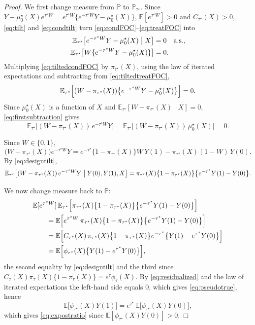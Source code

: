 \documentclass[11pt]{article}
\theoremstyle{definition}
\theoremstyle{plain}
\newcommand{\E}{\mathbb{E}}
\newcommand{\1}{\mathbf{1}}
\begin{document}
\begin{proof}
We first change measure from $\mathbb P$ to $\mathbb P_{\tau^\star}$.  Since $Y-\mu_0^\star(X)e^{\tau^\star W}=e^{\tau^\star W}\bigl\{e^{-\tau^\star W}Y-\mu_0^\star(X)\bigr\}$, $\E[e^{\tau^\star W}]>0$ and $C_{\tau^\star}(X)>0$, \eqref{eq:tilt} and \eqref{eq:condtilt} turn \eqref{eq:condFOC}--\eqref{eq:treatFOC} into
\begin{align}
\E_{\tau^\star}\big[e^{-\tau^\star W}Y-\mu_0^\star(X)\bigm| X\big] &= 0 \quad \text{a.s.},
\label{eq:tiltedcondFOC}
\\
\E_{\tau^\star}\big[W\{e^{-\tau^\star W}Y-\mu_0^\star(X)\}\big] &= 0.
\label{eq:tiltedtreatFOC}
\end{align}
Multiplying \eqref{eq:tiltedcondFOC} by $\pi_{\tau^\star}(X)$, using the law of iterated expectations and subtracting from \eqref{eq:tiltedtreatFOC},
\begin{equation}
\E_{\tau^\star}\Bigl[(W-\pi_{\tau^\star}(X))\bigl\{e^{-\tau^\star W}Y-\mu_0^\star(X)\bigr\}\Bigr]=0 .
\label{eq:firstsubtraction}
\end{equation}
Since $\mu_0^\star(X)$ is a function of $X$ and $\E_{\tau^\star}[W-\pi_{\tau^\star}(X)\mid X]=0$, \eqref{eq:firstsubtraction} gives
\begin{equation}
\E_{\tau^\star}\bigl[(W-\pi_{\tau^\star}(X))\,e^{-\tau^\star W}Y\bigr]
=
\E_{\tau^\star}\bigl[(W-\pi_{\tau^\star}(X))\,\mu_0^\star(X)\bigr]
=0 .
\label{eq:residualized}
\end{equation}

Since $W\in\{0,1\}$,
\[
\bigl(W-\pi_{\tau^\star}(X)\bigr)e^{-\tau^\star W}Y
=
e^{-\tau^\star}\bigl\{1-\pi_{\tau^\star}(X)\bigr\}W\,Y(1)-\pi_{\tau^\star}(X)(1-W)\,Y(0).
\]
By \eqref{eq:designtilt},
\[
\E_{\tau^\star}\bigl[(W-\pi_{\tau^\star}(X))\,e^{-\tau^\star W}Y\bigm| Y(0),Y(1),X\bigr]
=
\pi_{\tau^\star}(X)\bigl\{1-\pi_{\tau^\star}(X)\bigr\}\bigl\{e^{-\tau^\star}Y(1)-Y(0)\bigr\}.
\]

We now change measure back to $\mathbb P$:
\begin{align*}
&\E[e^{\tau^\star W}]\,\E_{\tau^\star}\Bigl[\pi_{\tau^\star}(X)\bigl\{1-\pi_{\tau^\star}(X)\bigr\}\bigl\{e^{-\tau^\star}Y(1)-Y(0)\bigr\}\Bigr]
\\
&\qquad=
\E\Bigl[e^{\tau^\star W}\,\pi_{\tau^\star}(X)\bigl\{1-\pi_{\tau^\star}(X)\bigr\}\bigl\{e^{-\tau^\star}Y(1)-Y(0)\bigr\}\Bigr]
\\
&\qquad=
\E\Bigl[C_{\tau^\star}(X)\,\pi_{\tau^\star}(X)\bigl\{1-\pi_{\tau^\star}(X)\bigr\}e^{-\tau^\star}\bigl\{Y(1)-e^{\tau^\star}Y(0)\bigr\}\Bigr]
\\
&\qquad=
\E\Bigl[\phi_{\tau^\star}(X)\bigl\{Y(1)-e^{\tau^\star}Y(0)\bigr\}\Bigr] ,
\end{align*}
the second equality by \eqref{eq:designtilt} and the third since $C_\tau(X)\pi_\tau(X)\{1-\pi_\tau(X)\}=e^{\tau}\phi_\tau(X)$.  By \eqref{eq:residualized} and the law of iterated expectations the left-hand side equals 0, which gives \eqref{eq:pseudotrue}, hence
\[
\E\bigl[\phi_{\tau^\star}(X)Y(1)\bigr]=e^{\tau^\star}\,\E\bigl[\phi_{\tau^\star}(X)Y(0)\bigr],
\]
which gives \eqref{eq:expostratio} since $\E[\phi_{\tau^\star}(X)Y(0)]>0$.
\end{proof}
\end{document}
